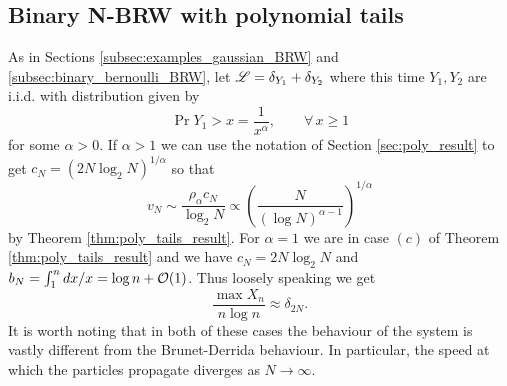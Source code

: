\subsection{Binary N-BRW with polynomial tails}
As in Sections \ref{subsec:examples_gaussian_BRW} and \ref{subsec:binary_bernoulli_BRW}, let $\scr{L} = \delta_{Y_1} + \delta_{Y_2}$ where this time $Y_1, Y_2$ are i.i.d. with distribution given by
\begin{equation}\nonumber
\Pr{Y_1 > x} = \frac{1}{x^\alpha},\qquad\forall\,x \geq 1
\end{equation}
for some $\alpha > 0$. If $\alpha > 1$ we can use the notation of Section \ref{sec:poly_result} to get $c_N = (2N \log_2 N)^{1/\alpha}$ so that
\begin{equation}\nonumber
v_N \sim \frac{\rho_\alpha c_N}{\log_2 N} \propto \left( \frac{N}{(\log N)^{\alpha - 1 }} \right)^{1/\alpha}
\end{equation}
by Theorem \ref{thm:poly_tails_result}. For $\alpha = 1$ we are in case $(c)$ of Theorem \ref{thm:poly_tails_result} and we have $c_N = 2 N \log_2 N$ and $b_N = \int^n_1 dx/x = \log n + \cal{O}(1)$. Thus loosely speaking we get 
\begin{equation}\nonumber
\frac{\max X_n}{n \log n} \approx \delta_{2N}. 
\end{equation}
It is worth noting that in both of these cases the behaviour of the system is vastly different from the Brunet-Derrida behaviour. In particular, the speed at which the particles propagate diverges as $N \to \infty$. 
\newpage
